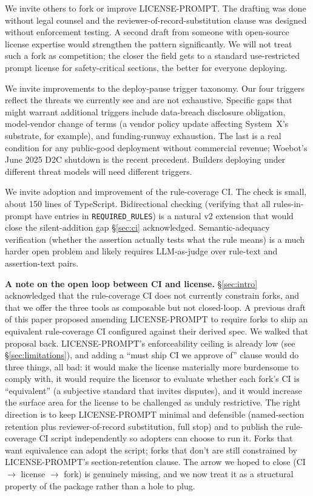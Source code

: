 \documentclass[letterpaper]{article} %
\begin{document}
We invite others to fork or improve LICENSE-PROMPT. The drafting was done without legal counsel and the reviewer-of-record-substitution clause was designed without enforcement testing. A second draft from someone with open-source license expertise would strengthen the pattern significantly. We will not treat such a fork as competition; the closer the field gets to a standard use-restricted prompt license for safety-critical sections, the better for everyone deploying.

We invite improvements to the deploy-pause trigger taxonomy. Our four triggers reflect the threats we currently see and are not exhaustive. Specific gaps that might warrant additional triggers include data-breach disclosure obligation, model-vendor change of terms (a vendor policy update affecting System~X's substrate, for example), and funding-runway exhaustion. The last is a real condition for any public-good deployment without commercial revenue; Woebot's June 2025 D2C shutdown is the recent precedent. Builders deploying under different threat models will need different triggers.

We invite adoption and improvement of the rule-coverage CI. The check is small, about 150 lines of TypeScript. Bidirectional checking (verifying that all rules-in-prompt have entries in \texttt{REQUIRED\_RULES}) is a natural v2 extension that would close the silent-addition gap \S\ref{sec:ci} acknowledged. Semantic-adequacy verification (whether the assertion actually tests what the rule means) is a much harder open problem and likely requires LLM-as-judge over rule-text and assertion-text pairs.

\noindent\textbf{A note on the open loop between CI and license.} \S\ref{sec:intro} acknowledged that the rule-coverage CI does not currently constrain forks, and that we offer the three tools as composable but not closed-loop. A previous draft of this paper proposed amending LICENSE-PROMPT to require forks to ship an equivalent rule-coverage CI configured against their derived spec. We walked that proposal back. LICENSE-PROMPT's enforceability ceiling is already low (see \S\ref{sec:limitations}), and adding a ``must ship CI we approve of'' clause would do three things, all bad: it would make the license materially more burdensome to comply with, it would require the licensor to evaluate whether each fork's CI is ``equivalent'' (a subjective standard that invites disputes), and it would increase the surface area for the license to be challenged as unduly restrictive. The right direction is to keep LICENSE-PROMPT minimal and defensible (named-section retention plus reviewer-of-record substitution, full stop) and to publish the rule-coverage CI script independently so adopters can choose to run it. Forks that want equivalence can adopt the script; forks that don't are still constrained by LICENSE-PROMPT's section-retention clause. The arrow we hoped to close (CI $\rightarrow$ license $\rightarrow$ fork) is genuinely missing, and we now treat it as a structural property of the package rather than a hole to plug.
\end{document}
